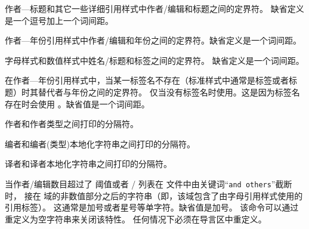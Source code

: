 \begin{ltxsyntax}
\CSdelimMark
作者---标题和其它一些详细引用样式中作者/编辑和标题之间的定界符。
缺省定义是一个逗号加上一个词间距。

\CSdelimMark
作者---年份引用样式中作者/编辑和年份之间的定界符。缺省定义是一个词间距。

\CSdelimMark
字母样式和数值样式中姓名\slash 标题和标签之间的定界符。
缺省定义是一个词间距。

\CSdelimMark
在作者---年份引用样式中，当某一标签名不存在（标准样式中通常是标签或者标题）时其替代者与年份之间的定界符。
仅当没有标签名时使用。这是因为标签名存在时会使用 。缺省值是一个词间距。

\CSdelimMark
作者和作者类型之间打印的分隔符。

\CSdelimMark
编者和编者(类型)本地化字符串之间打印的分隔符。

\CSdelimMark
译者和译者本地化字符串之间打印的分隔符。

当作者/编辑数目超过了  阈值或者 \slash {} 列表在  文件中由关键词“\texttt{and others}”截断时，
接在  域的非数值部分之后的字符串（即，该域包含了由字母引用样式使用的引用标签）。
这通常是加号或者星号等单字符。缺省值是加号。
该命令可以通过重定义为空字符串来关闭该特性。
任何情况下必须在导言区中重定义。


\end{ltxsyntax}
